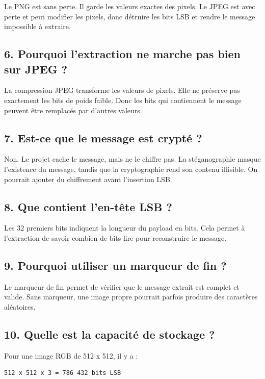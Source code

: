 \documentclass[11pt,a4paper]{article}
\begin{document}
Le PNG est sans perte. Il garde les valeurs exactes des pixels. Le JPEG est avec perte et peut modifier les pixels, donc détruire les bits LSB et rendre le message impossible à extraire.

\subsection{6. Pourquoi l'extraction ne marche pas bien sur JPEG ?}

La compression JPEG transforme les valeurs de pixels. Elle ne préserve pas exactement les bits de poids faible. Donc les bits qui contiennent le message peuvent être remplacés par d'autres valeurs.

\subsection{7. Est-ce que le message est crypté ?}

Non. Le projet cache le message, mais ne le chiffre pas. La stéganographie masque l'existence du message, tandis que la cryptographie rend son contenu illisible. On pourrait ajouter du chiffrement avant l'insertion LSB.

\subsection{8. Que contient l'en-tête LSB ?}

Les 32 premiers bits indiquent la longueur du payload en bits. Cela permet à l'extraction de savoir combien de bits lire pour reconstruire le message.

\subsection{9. Pourquoi utiliser un marqueur de fin ?}

Le marqueur de fin permet de vérifier que le message extrait est complet et valide. Sans marqueur, une image propre pourrait parfois produire des caractères aléatoires.

\subsection{10. Quelle est la capacité de stockage ?}

Pour une image RGB de 512 x 512, il y a :

\begin{lstlisting}
512 x 512 x 3 = 786 432 bits LSB
\end{lstlisting}
\end{document}
